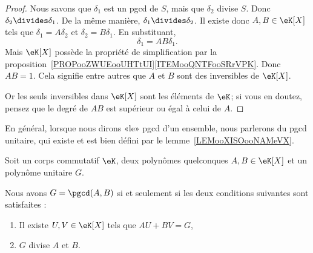 \begin{proof}
    Nous savons que \( \delta_1\) est un pgcd de \( S\), mais que \( \delta_2\) divise \( S\). Donc \( \delta_2\divides \delta_1\). De la même manière, \( \delta_1\divides \delta_2\). Il existe donc \( A,B\in \eK[X]\) tels que \( \delta_1=A\delta_2\) et \( \delta_2=B\delta_1\). En substituant,
    \begin{equation}
        \delta_1=AB\delta_1.
    \end{equation}
    Mais \( \eK[X]\) possède la propriété de simplification par la proposition~\ref{PROPooZWUEooUHTtUI}\ref{ITEMooQNTFooSRrVPK}. Donc \( AB=1\). Cela signifie entre autres que \( A\) et \( B\) sont des inversibles de \( \eK[X]\).

    Or les seuls inversibles dans \( \eK[X]\) sont les éléments de \( \eK\); si vous en doutez, pensez que le degré de \( AB\) est supérieur ou égal à celui de \( A\).
\end{proof}

\begin{normaltext}
    En général, lorsque nous dirons «le» pgcd d'un ensemble, nous parlerons du pgcd unitaire, qui existe et est bien défini par le lemme~\ref{LEMooXISOooNAMeVX}.
\end{normaltext}


\begin{lemma}        \label{LEMooIAGMooHUQtUs}
    Soit un corps commutatif \( \eK\), deux polynômes quelconques \( A,B\in \eK[X]\) et un polynôme unitaire \( G\).

    Nous avons \( G=\pgcd(A,B)\) si et seulement si les deux conditions suivantes sont satisfaites :
    \begin{enumerate}
        \item
            Il existe \( U,V\in \eK[X]\) tels que \( AU+BV=G\),
        \item
            \( G\) divise \( A\) et \( B\).
    \end{enumerate}
\end{lemma}

